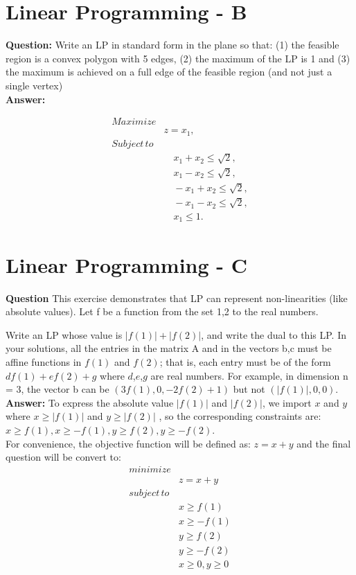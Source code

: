 \documentclass[12pt]{article}
\begin{document}
\section{Linear Programming - B}
\textbf{Question:}
Write an LP in standard form in the plane so that: (1) the feasible region is a convex polygon with 5 edges, (2) the maximum of the LP is 1 and (3) the maximum is achieved on a full edge of the feasible region (and not just a single vertex)\\
\textbf{Answer:}

\[
\begin{aligned}
Maximize& \\
&z = x_1, \\
Subject \, to& \\
& \quad x_1 + x_2 \leq \sqrt{2}, \\
& \quad x_1 - x_2 \leq \sqrt{2}, \\
& \quad -x_1 + x_2 \leq \sqrt{2}, \\
& \quad -x_1 - x_2 \leq \sqrt{2}, \\
& \quad x_1 \leq 1.
\end{aligned}
\]
\section{Linear Programming - C}
\textbf{Question}
This exercise demonstrates that LP can represent non-linearities (like absolute values). Let f be a function from the set {1,2} to the real numbers. 

Write an LP whose value is $|f(1)|+|f(2)|$, and write the dual to this LP. In your solutions, all the entries in the matrix A and in the vectors b,c must be affine functions in $f(1)$ and $f(2)$; that is, each entry must be of the form $d f(1) + e f(2) + g$ where $d$,$e$,$g$ are real numbers. For example, in dimension n = 3, the vector b can be $(3 f(1), 0, -2f(2)+1)$ but not $(|f(1)|,0,0)$. \\
\textbf{Answer:}
To express the absolute value  $|f(1)|$ and $|f(2)|$,  we import $x$ and $y$ where $x  \geq|f(1)|$ and $y  \geq|f(2)|$ , so the corresponding constraints are: $x \geq f(1), x \geq -f(1), y \geq f(2), y \geq -f(2)$.\\
For convenience, the objective function will be defined as:
$z = x + y$ and the final question will be convert to:\\
\begin{equation}
\begin{aligned}
minimize& \\
& z = x + y\\
subject \, to&  \\
& x \geq f(1)\\
& x \geq -f(1)\\
& y \geq f(2)\\
& y \geq -f(2)\\
& x\geq 0, y \geq 0\\
\end{aligned}
\end{equation}
\end{document}
